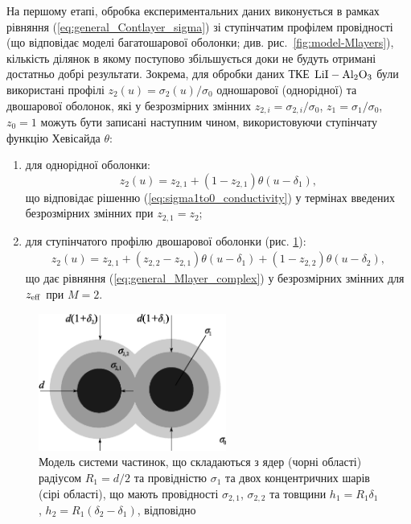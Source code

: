 \documentclass[14pt,twoside]{vakthesis}
\begin{document}
На першому етапі, обробка експериментальних даних виконується в рамках рівняння (\ref{eq:general_Contlayer_sigma}) зі ступінчатим профілем провідності (що відповідає моделі багатошарової оболонки; див. рис.~\ref{fig:model-Mlayers}), кількість ділянок в якому поступово збільшується доки не будуть отримані достатньо добрі результати. Зокрема, для обробки даних ТКЕ $\rm LiI-Al_2O_3$ були використані  профілі ${z}_2 (u) = \sigma_2 (u)/\sigma_0$ одношарової (однорідної) та двошарової оболонок, які у безрозмірних змінних ${z}_{2,i} = \sigma_{2,i}/\sigma_0$, $z_1 = \sigma_1/\sigma_0$, $z_0 = 1$ можуть бути записані наступним чином, використовуючи ступінчату функцію Хевісайда $\theta$:
\begin{enumerate}[leftmargin=*, label={\alph*)}]
	\item для однорідної оболонки:
	\begin{equation}\label{eq:profilex2-uniform}
	{z}_2 (u) = {z}_{2,1} + (1 - {z}_{2,1}) \theta(u - \delta_1),
	\end{equation}
	що відповідає рішенню (\ref{eq:sigma1to0_conductivity}) у термінах введених безрозмірних змінних при ${z}_{2,1} = {z}_2$;
	
	\item для ступінчатого профілю двошарової оболонки (рис. \ref{fig:model-2layers}):
	\begin{equation}\label{eq:profilex2-double}
	\begin{split}
	{z}_2 (u) = {z}_{2,1} +
	({z}_{2,2} - {z}_{2,1}) \theta(u - \delta_1) + (1 - {z}_{2,2}) \theta(u - \delta_2),
	\end{split}
	\end{equation}
	що дає рівняння (\ref{eq:general_Mlayer_complex}) у безрозмірних змінних для ${z}_{\rm eff}$ при $M=2$.
\end{enumerate}

\begin{figure}[!ht]
	\centering
	\includegraphics[width=0.55\textwidth]{model-2layer-sigma.eps}
	\caption{\label{fig:model-2layers} Модель системи частинок, що складаються з ядер (чорні області) радіусом $R_1 = d/2$ та провідністю $\sigma_{1}$ та двох концентричних шарів (сірі області), що мають провідності $\sigma_{2,1}$, $\sigma_{2,2}$ та товщини $h_1 = R_1\delta_1$, $h_2 = R_1(\delta_2 - \delta_1)$, відповідно}
\end{figure}
\end{document}
